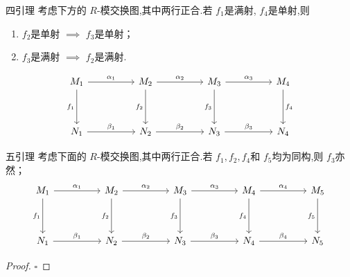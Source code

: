 \documentclass[../../几何与拓扑.tex]{subfiles}
\begin{document}
\begin{corollary}{四引理}
    考虑下方的 \(  R  \)-模交换图,其中两行正合.若 \(  f_1  \)是满射, \(  f_4  \)是单射,则 
    \begin{enumerate}
        \item \(  f_2  \)是单射 \(  \implies  \) \(  f_3  \)是单射；
        \item  \(  f_3  \)是满射 \(  \implies  \) \(  f_2  \)是满射.      
    \end{enumerate}
        \[\begin{tikzcd}
	{M_1} && {M_2} && {M_3} && {M_4} \\
	\\
	{N_1} && {N_2} && {N_3} && {N_4}
	\arrow["{\alpha_1}", from=1-1, to=1-3]
	\arrow["{f_1}"', from=1-1, to=3-1]
	\arrow["{\alpha_2}", from=1-3, to=1-5]
	\arrow["{f_2}"', from=1-3, to=3-3]
	\arrow["{\alpha_3}", from=1-5, to=1-7]
	\arrow["{f_3}"', from=1-5, to=3-5]
	\arrow["{f_4}", from=1-7, to=3-7]
	\arrow["{\beta_1}", from=3-1, to=3-3]
	\arrow["{\beta_2}", from=3-3, to=3-5]
	\arrow["{\beta_3}", from=3-5, to=3-7]
\end{tikzcd}\]
\end{corollary}

\begin{corollary}{五引理}\label{five-lemma}
    考虑下面的 \(  R  \)-模交换图,其中两行正合.若 \(  f_1,f_2,f_4  \)和 \(  f_5  \)均为同构,则 \(  f_3  \)亦然；    
    \[\begin{tikzcd}
        {M_1} && {M_2} && {M_3} && {M_4} && {M_5} \\
        \\
        {N_1} && {N_2} && {N_3} && {N_4} && {N_5}
        \arrow["{\alpha_1}", from=1-1, to=1-3]
        \arrow["{f_1}"', from=1-1, to=3-1]
        \arrow["{\alpha_2}", from=1-3, to=1-5]
        \arrow["{f_2}"', from=1-3, to=3-3]
        \arrow["{\alpha_3}", from=1-5, to=1-7]
        \arrow["{f_3}"', from=1-5, to=3-5]
        \arrow["{\alpha_4}", from=1-7, to=1-9]
        \arrow["{f_4}"', from=1-7, to=3-7]
        \arrow["{f_5}"', from=1-9, to=3-9]
        \arrow["{\beta_1}", from=3-1, to=3-3]
        \arrow["{\beta_2}", from=3-3, to=3-5]
        \arrow["{\beta_3}", from=3-5, to=3-7]
        \arrow["{\beta_4}", from=3-7, to=3-9]
    \end{tikzcd}\]
    
\end{corollary}

\begin{proof}


    \hfill $\square$
\end{proof}
\end{document}
